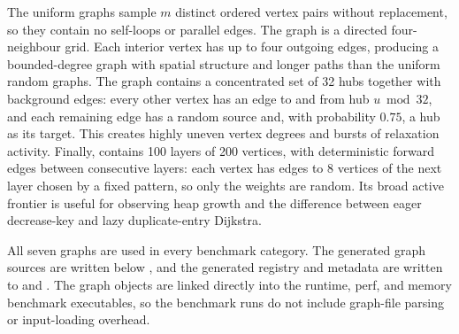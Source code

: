 The uniform graphs sample $m$ distinct ordered vertex pairs without
replacement, so they contain no self-loops or parallel edges. The
 graph is a directed four-neighbour grid. Each interior
vertex has up to four outgoing edges, producing a bounded-degree graph with
spatial structure and longer paths than the uniform random graphs. The
 graph contains a concentrated set of 32 hubs together with
background edges: every other vertex has an edge to and from hub $u \bmod 32$,
and each remaining edge has a random source and, with probability $0.75$, a
hub as its target. This creates highly uneven vertex degrees and bursts of
relaxation activity. Finally,  contains 100 layers of
200 vertices, with deterministic forward edges between consecutive layers: each vertex
has edges to 8 vertices of the next layer chosen by a fixed pattern, so only
the weights are random.
Its broad active frontier is useful for observing heap growth and the
difference between eager decrease-key and lazy duplicate-entry Dijkstra.

All seven graphs are used in every benchmark category. The generated graph
sources are written below , and the generated registry and
metadata are written to  and
. The graph objects are linked directly into the
runtime, perf, and memory benchmark executables, so the benchmark runs do not
include graph-file parsing or input-loading overhead.